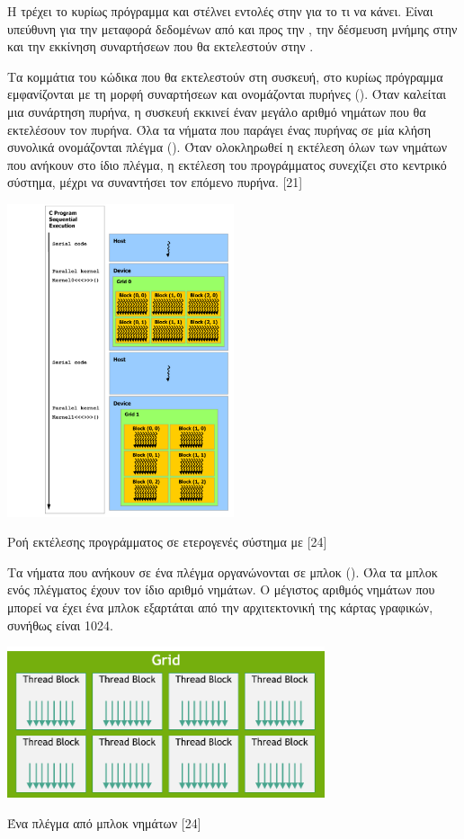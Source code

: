 Η  τρέχει το κυρίως πρόγραμμα και στέλνει εντολές στην  για το τι να κάνει. Είναι υπεύθυνη για την μεταφορά δεδομένων από και προς την , την δέσμευση μνήμης στην  και την εκκίνηση συναρτήσεων που θα εκτελεστούν στην .

Τα κομμάτια του κώδικα που θα εκτελεστούν στη συσκευή, στο κυρίως πρόγραμμα εμφανίζονται με τη μορφή συναρτήσεων και ονομάζονται πυρήνες (). Όταν καλείται μια συνάρτηση πυρήνα, η συσκευή εκκινεί έναν μεγάλο αριθμό νημάτων που θα εκτελέσουν τον πυρήνα. Όλα τα νήματα που παράγει ένας πυρήνας σε μία κλήση συνολικά ονομάζονται πλέγμα (). Όταν ολοκληρωθεί η εκτέλεση όλων των νημάτων που ανήκουν στο ίδιο πλέγμα, η εκτέλεση του προγράμματος συνεχίζει στο κεντρικό σύστημα, μέχρι να συναντήσει τον επόμενο πυρήνα. [21]
 
\begin{Illustration}[!h] 
	\centering
	\includegraphics[width=0.5\textwidth]{images/image048.png} 
	\caption{Ροή εκτέλεσης προγράμματος σε ετερογενές σύστημα με  [24]}
	\label{image-3.5}
\end{Illustration}

Τα νήματα που ανήκουν σε ένα πλέγμα οργανώνονται σε μπλοκ (). Όλα τα μπλοκ ενός πλέγματος έχουν τον ίδιο αριθμό νημάτων. Ο μέγιστος αριθμός νημάτων που μπορεί να έχει ένα μπλοκ εξαρτάται από την αρχιτεκτονική της κάρτας γραφικών, συνήθως είναι 1024.
 
\begin{Illustration}[!h] 
	\centering
	\includegraphics[width=0.7\textwidth]{images/image049.png} 
	\caption{Ένα πλέγμα από μπλοκ νημάτων [24]}
	\label{image-3.6}
\end{Illustration}

